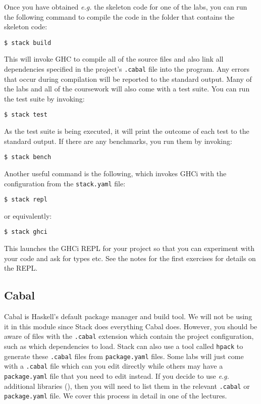 Once you have obtained \emph{e.g.} the skeleton code for one of the labs, you can run the following command to compile the code in the folder that contains the skeleton code:
\begin{verbatim}
$ stack build
\end{verbatim}
This will invoke GHC to compile all of the source files and also link all dependencies specified in the project's \texttt{\small .cabal} file into the program. Any errors that occur during compilation will be reported to the standard output. Many of the labs and all of the coursework will also come with a test suite. You can run the test suite by invoking:
\begin{verbatim}
$ stack test
\end{verbatim}
As the test suite is being executed, it will print the outcome of each test to the standard output. If there are any benchmarks, you run them by invoking:
\begin{verbatim}
$ stack bench
\end{verbatim}
Another useful command is the following, which invokes GHCi with the configuration from the \texttt{\small stack.yaml} file:
\begin{verbatim}
$ stack repl
\end{verbatim}
or equivalently:
\begin{verbatim}
$ stack ghci
\end{verbatim}
This launches the GHCi REPL for your project so that you can experiment with your code and ask for types etc. See the notes for the first exercises for details on the REPL.

\subsection{Cabal}

Cabal is Haskell's default package manager and build tool. We will not be using it in this module since Stack does everything Cabal does. However, you should be aware of files with the \texttt{\small .cabal} extension which contain the project configuration, such as which dependencies to load. Stack can also use a tool called \texttt{\small hpack} to generate these \texttt{\small .cabal} files from \texttt{\small package.yaml} files. Some labs will just come with a \texttt{\small .cabal} file which can you edit directly while others may have a \texttt{\small package.yaml} file that you need to edit instead. If you decide to use \emph{e.g.} additional libraries (), then you will need to list them in the relevant \texttt{\small .cabal} or \texttt{\small package.yaml} file. We cover this process in detail in one of the lectures.

